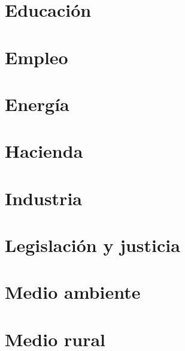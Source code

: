 \documentclass[
  10pt,
  a4paper,
  DIV=11,
  numbers=noendperiod]{scrreprt}
\begin{document}

\hypertarget{educaciuxf3n}{%
\chapter{Educación}\label{educaciuxf3n}}


\hypertarget{empleo}{%
\chapter{Empleo}\label{empleo}}


\hypertarget{energuxeda}{%
\chapter{Energía}\label{energuxeda}}


\hypertarget{hacienda}{%
\chapter{Hacienda}\label{hacienda}}


\hypertarget{industria}{%
\chapter{Industria}\label{industria}}


\hypertarget{legislaciuxf3n-y-justicia}{%
\chapter{Legislación y justicia}\label{legislaciuxf3n-y-justicia}}


\hypertarget{medio-ambiente}{%
\chapter{Medio ambiente}\label{medio-ambiente}}


\hypertarget{medio-rural}{%
\chapter{Medio rural}\label{medio-rural}}
\end{document}
